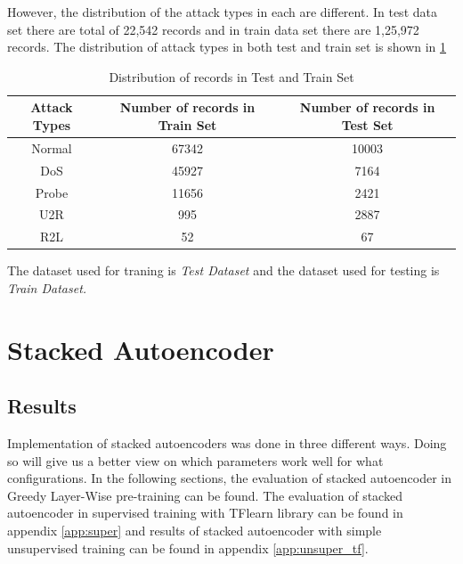 \documentclass[12pt, a4paper]{report}
\begin{document}
However, the distribution of the attack types in each are different. In test data set there are total of 22,542 records and in train data set there are 1,25,972 records.  
The distribution of attack types in both test and train set is shown in \ref{table:test_train}\\ \par 
\begin{table}[h]
\centering
\begin{tabular}{|c|c|c|}
\hline
\textbf{Attack Types} & \textbf{Number of records in Train Set} & \textbf{Number of records in Test Set} \\ \hline
Normal                & 67342                                   & 10003                                  \\ \hline
DoS                   & 45927                                   & 7164                                   \\ \hline
Probe                 & 11656                                   & 2421                                   \\ \hline
U2R                   & 995                                     & 2887                                   \\ \hline
R2L                   & 52                                      & 67                                     \\ \hline
\end{tabular}
\caption{Distribution of records in Test and Train Set}
\label{table:test_train}
\end{table}

The dataset used for traning is \textit{Test Dataset} and the dataset used for testing is \textit{Train Dataset.}

\section{Stacked Autoencoder}\label{sec:autoencoder}

\subsection{Results}\label{results}

Implementation of stacked autoencoders was done in three different ways. Doing so will give us a better view on which parameters work well for what configurations. In the following sections, the evaluation of stacked autoencoder in Greedy Layer-Wise pre-training can be found. The evaluation of stacked autoencoder in supervised training with TFlearn library can be found in appendix \ref{app:super} and results of stacked autoencoder with simple unsupervised training can be found in appendix \ref{app:unsuper_tf}.
\end{document}
